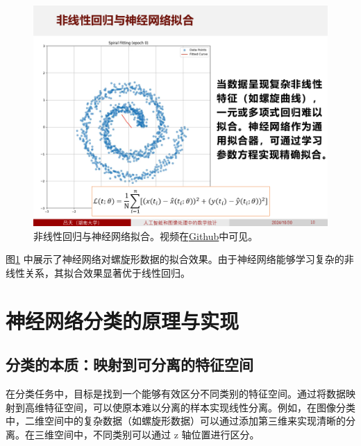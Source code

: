 \documentclass[
    report,     %
    oneside,    %
    UTF8,       %
    zihao=-4    %
]{config} %
\begin{document}
\begin{figure}[H]
    \centering
    \includegraphics[width=\linewidth]{figures/回归分析与梯度下降/3.PNG}
    \caption[非线性回归与神经网络拟合]{非线性回归与神经网络拟合。视频在\href{https://github.com/PhD-TianLv/Mathematical-Statistics-in-Artificial-Intelligence-and-Image-Processing/blob/main/videos/2-非线性回归与神经网络拟合.mp4}{Github}\footnotemark 中可见。}
    \label{fig:nonlinear_regression_nn}
\end{figure}


图\ref{fig:nonlinear_regression_nn} 中展示了神经网络对螺旋形数据的拟合效果。由于神经网络能够学习复杂的非线性关系，其拟合效果显著优于线性回归。


\chapter{神经网络分类的原理与实现}

\section{分类的本质：映射到可分离的特征空间}

在分类任务中，目标是找到一个能够有效区分不同类别的特征空间。通过将数据映射到高维特征空间，可以使原本难以分离的样本实现线性分离。例如，在图像分类中，二维空间中的复杂数据（如螺旋形数据）可以通过添加第三维来实现清晰的分离。在三维空间中，不同类别可以通过 z 轴位置进行区分。
\end{document}
